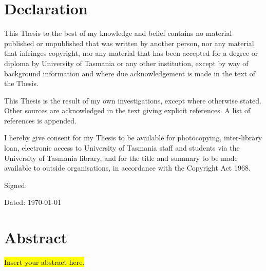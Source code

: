 \null\cleardoublepage
{}



\chapter{Declaration}

This Thesis to the best of my knowledge and belief contains no material published or unpublished that was written by another person, nor any material that infringes copyright, nor any material that has been accepted for a degree or diploma by University of Tasmania or any other institution, except by way of background information and where due acknowledgement is made in the text of the Thesis.

This Thesis is the result of my own investigations, except where otherwise stated. Other sources are acknowledged in the text giving explicit references. A list of references is appended.


I hereby give consent for my Thesis to be available for photocopying, inter-library loan, electronic access to University of Tasmania staff and students via the University of Tasmania library, and for the title and summary to be made available to outside organisations, in accordance with the Copyright Act 1968. 


   \bigskip
   \bigskip

Signed:

   \bigskip
   \bigskip

Dated: \today      %


\chapter{Abstract}

\hl{Insert your abstract here.}


